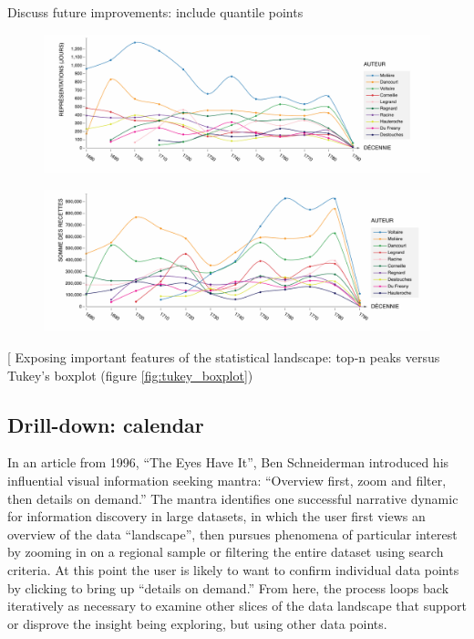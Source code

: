 \documentclass[	DIV=calc,%
							paper=a4,%
							fontsize=11pt,%
							twocolumn]{scrartcl}	 					%
\begin{document}
Discuss future improvements:  include quantile points

\begin{figure}
  \centering
	\includegraphics[width=7in]{steps/top-author-performances.png}
	\caption{}
	\label{fig:top-author-performances}
\end{figure}

\begin{figure}
  \centering
	\includegraphics[width=7in]{steps/top-author-receipts.png}
	\caption{}
	\label{fig:top-author-receipts}
\end{figure}

[ Exposing important features of the statistical landscape: top-n peaks versus Tukey’s boxplot (figure \ref{fig:tukey_boxplot})

\subsection*{Drill-down: calendar}

In an article from 1996, ``The Eyes Have It'', Ben Schneiderman introduced his influential visual information seeking mantra: ``Overview first, zoom and filter, then details on demand.''\cite{Shneiderman:1996}  The mantra identifies one successful narrative dynamic for information discovery in large datasets, in which the user first views an overview of the data ``landscape'', then pursues phenomena of particular interest by zooming in on a regional sample or filtering the entire dataset using search criteria.  At this point the user is likely to want to confirm individual data points by clicking to bring up ``details on demand.''  From here, the process loops back iteratively as necessary to examine other slices of the data landscape that support or disprove the insight being exploring, but using other data points.
\end{document}
